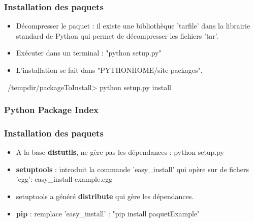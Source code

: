 \begin{frame}[fragile]
\frametitle{Installation des paquets}
\begin{itemize}
\item Décompresser le paquet : il existe une bibliothèque 'tarfile' dans la librairie standard de Python qui permet de décompresser les fichiers 'tar'. 
\item Exécuter dans un terminal : "python setup.py"
\item L'installation se fait dans "PYTHONHOME/site-packages".
\end{itemize}
\begin{shell}
~/tempdir/packageToInstall> python setup.py install
\end{shell}
\end{frame}
\begin{frame}
\frametitle{Python Package Index}
\end{frame}
\begin{frame}
\frametitle{Installation des paquets}
\begin{itemize}
\item A la base {\bfseries distutils}, ne gère pas les dépendances : python setup.py  
\item {\bfseries setuptools} : introduit la commande 'easy\_install' qui opère sur de fichers 'egg': easy\_install example.egg
\item setuptools a généré {\bfseries distribute} qui gère les dépendances. 
\item {\bfseries pip} : remplace 'easy\_install' : "pip install paquetExample" 
\end{itemize}
\end{frame}
